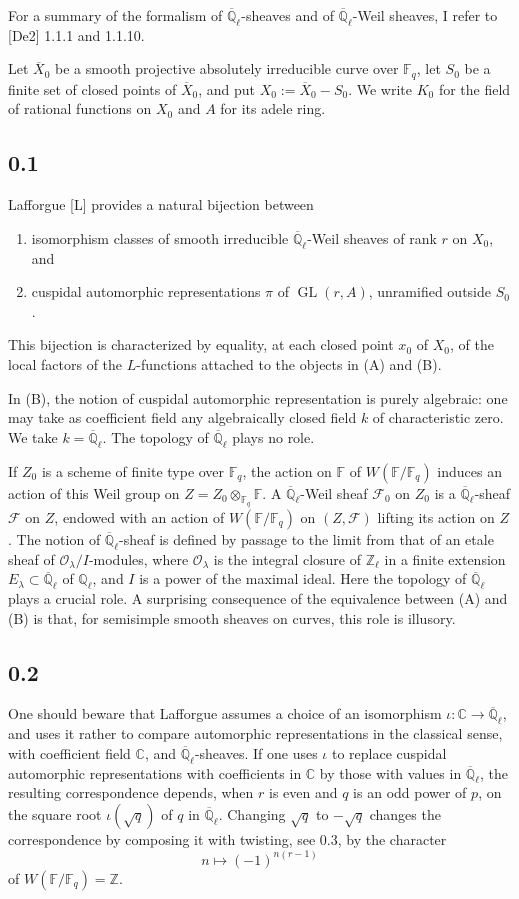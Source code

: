\documentclass[11pt]{article}
\newcommand{\F}{\mathbb{F}}
\newcommand{\Z}{\mathbb{Z}}
\newcommand{\Ql}{\overline{\mathbb Q}_{\ell}}
\newcommand{\GL}{\operatorname{GL}}
\begin{document}
For a summary of the formalism of $\Ql$-sheaves and of $\Ql$-Weil sheaves, I refer to [De2] 1.1.1 and 1.1.10.

Let $\overline X_0$ be a smooth projective absolutely irreducible curve over $\F_q$, let $S_0$ be a finite set of closed points of $\overline X_0$, and put $X_0:=\overline X_0-S_0$.
We write $K_0$ for the field of rational functions on $X_0$ and $A$ for its adele ring.

\subsection*{0.1}
Lafforgue [L] provides a natural bijection between
\begin{enumerate}[label=(\Alph*)]
\item isomorphism classes of smooth irreducible $\Ql$-Weil sheaves of rank $r$ on $X_0$, and
\item cuspidal automorphic representations $\pi$ of $\GL(r,A)$, unramified outside $S_0$.
\end{enumerate}
This bijection is characterized by equality, at each closed point $x_0$ of $X_0$, of the local factors of the $L$-functions attached to the objects in (A) and (B).

In (B), the notion of cuspidal automorphic representation is purely algebraic: one may take as coefficient field any algebraically closed field $k$ of characteristic zero. We take $k=\Ql$. The topology of $\Ql$ plays no role.

If $Z_0$ is a scheme of finite type over $\F_q$, the action on $\F$ of $W(\F/\F_q)$ induces an action of this Weil group on $Z=Z_0\otimes_{\F_q}\F$.
A $\Ql$-Weil sheaf $\mathcal F_0$ on $Z_0$ is a $\Ql$-sheaf $\mathcal F$ on $Z$, endowed with an action of $W(\F/\F_q)$ on $(Z,\mathcal F)$ lifting its action on $Z$.
The notion of $\Ql$-sheaf is defined by passage to the limit from that of an etale sheaf of $\mathcal O_\lambda/I$-modules, where $\mathcal O_\lambda$ is the integral closure of $\mathbb Z_\ell$ in a finite extension $E_\lambda\subset\Ql$ of $\mathbb Q_\ell$, and $I$ is a power of the maximal ideal.
Here the topology of $\Ql$ plays a crucial role.
A surprising consequence of the equivalence between (A) and (B) is that, for semisimple smooth sheaves on curves, this role is illusory.

\subsection*{0.2}
One should beware that Lafforgue assumes a choice of an isomorphism $\iota:\mathbb C\to\Ql$, and uses it rather to compare automorphic representations in the classical sense, with coefficient field $\mathbb C$, and $\Ql$-sheaves.
If one uses $\iota$ to replace cuspidal automorphic representations with coefficients in $\mathbb C$ by those with values in $\Ql$, the resulting correspondence depends, when $r$ is even and $q$ is an odd power of $p$, on the square root $\iota(\sqrt q)$ of $q$ in $\Ql$.
Changing $\sqrt q$ to $-\sqrt q$ changes the correspondence by composing it with twisting, see 0.3, by the character
\[
 n\longmapsto (-1)^{n(r-1)}
\]
of $W(\F/\F_q)=\Z$.
\end{document}

